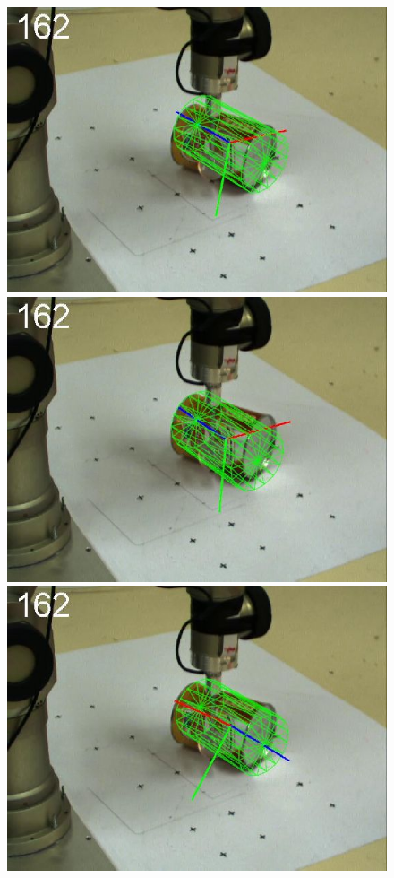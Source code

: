 \begin{figure}[htbp]
{\includegraphics[width=\imgAXwid]{images/A3_2exp_39_3}
\includegraphics[width=\imgAXwid]{images/A3_LWPR1_39_3}
\includegraphics[width=\imgAXwid]{images/A3_physx_39_3}
}
\end{figure}

